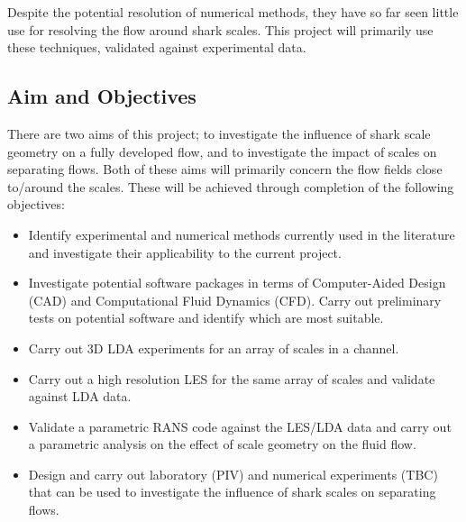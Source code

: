 \documentclass[12pt,oneside,a4paper]{article}
\begin{document}
Despite the potential resolution of numerical methods, they have so far seen little use for resolving the flow around shark scales. This project will primarily use these techniques, validated against experimental data.

\subsection{Aim and Objectives}
\label{section:AandO}

There are two aims of this project; to investigate the influence of shark scale geometry on a fully developed flow, and to investigate the impact of scales on separating flows. Both of these aims will primarily concern the flow fields close to/around the scales. These will be achieved through completion of the following objectives:
\begin{itemize}
\itemsep0em

\item Identify experimental and numerical methods currently used in the literature and investigate their applicability to the current project.

\item Investigate potential software packages in terms of Computer-Aided Design (CAD) and Computational Fluid Dynamics (CFD). Carry out preliminary tests on potential software and identify which are most suitable. 

\item Carry out 3D LDA experiments for an array of scales in a channel.

\item Carry out a high resolution LES for the same array of scales and validate against LDA data. 

\item Validate a parametric RANS code against the LES/LDA data and carry out a parametric analysis on the effect of scale geometry on the fluid flow. 

\item Design and carry out laboratory (PIV) and numerical experiments (TBC) that can be used to investigate the influence of shark scales on separating flows.  

\end{itemize}
\end{document}
